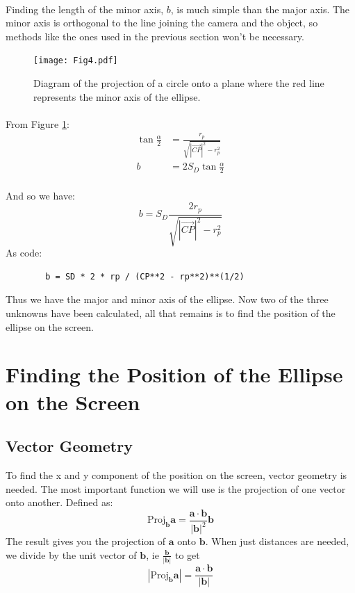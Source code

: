 \documentclass{article}
\newcommand\cpv{\overrightarrow{CP}\xspace}
\begin{document}
	\paragraph{}
	Finding the length of the minor axis, $b$, is much simple than the major axis. The minor axis is orthogonal to the line joining the camera
	and the object, so methods like the ones used in the previous section won't be necessary.
	\begin{figure}[H]
		\texttt{[image: Fig4.pdf]}
		\caption{Diagram of the projection of a circle onto a plane where the red line represents the minor axis of the ellipse.}
		\label{fig:minorAxis}
	\end{figure}
	\paragraph{}
	From Figure \ref{fig:minorAxis}:
	\begin{align*}
		\tan{\frac{\alpha}{2}} & = \frac{r_p}{\sqrt{\left|\cpv\right|^2 - r_p^2}} \\
		b & = 2 S_D \tan{\frac{\alpha}{2}}
	\end{align*}
	\paragraph{}
	And so we have:
	\begin{equation}
		b = S_D \frac{2 r_p}{\sqrt{\left|\cpv\right|^2 - r_p^2}}
	\end{equation}
	As code:
	\begin{verbatim}
		b = SD * 2 * rp / (CP**2 - rp**2)**(1/2)
	\end{verbatim}
	Thus we have the major and minor axis of the ellipse. Now two of the three unknowns have been calculated, all that remains is to find the position of the ellipse on the screen.

\section{Finding the Position of the Ellipse on the Screen}
	\subsection{Vector Geometry}
	To find the x and y component of the position on the screen, vector geometry is needed. The most important function we will use is the
	projection of one vector onto another. Defined as:
	$$ \text{Proj}_{\mathbf{b}}\mathbf{a} = \frac{\mathbf{a} \cdot \mathbf{b}}{|\mathbf{b}|^2} \mathbf{b} $$
	The result gives you the projection of $\mathbf{a}$ onto $\mathbf{b}$. When just distances are needed, we divide
	by the unit vector of $\mathbf{b}$, ie $\frac{\mathbf{b}}{|\mathbf{b}|}$ to get
	$$ \left|\text{Proj}_\mathbf{b} \mathbf{a}\right| = \frac{\mathbf{a} \cdot \mathbf{b}}{|\mathbf{b}|} $$
\end{document}
